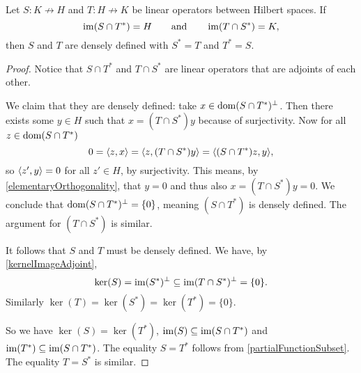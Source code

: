 \begin{proposition} \label{adjointRangeCriterion}
Let $S: K\not\to H$ and $T: H\not\to K$ be linear operators between Hilbert spaces. If
\[ \operatorname{im}(S\cap T^*) = H \qquad\text{and}\qquad \operatorname{im}(T\cap S^*) = K, \]
then $S$ and $T$ are densely defined with $S^* = T$ and $T^* = S$.
\end{proposition}
\begin{proof}
Notice that $S\cap T^*$ and $T\cap S^*$ are linear operators that are adjoints of each other.

We claim that they are densely defined: take $x\in \operatorname{dom}(S\cap T^*)^\perp$. Then there exists some $y\in H$ such that $x = (T\cap S^*)y$ because of surjectivity. Now for all $z\in \operatorname{dom}(S\cap T^*)$
\[ 0 = \inner{z,x} = \inner{z, (T\cap S^*)y} = \inner{(S\cap T^*)z, y}, \]
so $\inner{z',y} = 0$ for all $z'\in H$, by surjectivity. This means, by \ref{elementaryOrthogonality}, that $y=0$ and thus also $x = (T\cap S^*)y = 0$. We conclude that $\operatorname{dom}(S\cap T^*)^\perp = \{0\}$, meaning $(S\cap T^*)$ is densely defined. The argument for $(T\cap S^*)$ is similar.

It follows that $S$ and $T$ must be densely defined. We have, by \ref{kernelImageAdjoint},
\[ \ker(S) = \operatorname{im}(S^*)^\perp \subseteq \operatorname{im}(T\cap S^*)^\perp = \{0\}. \]
Similarly $\ker(T) = \ker(S^*) = \ker(T^*) = \{0\}$.

So we have $\ker(S) = \ker(T^*)$, $\operatorname{im}(S)\subseteq \operatorname{im}(S\cap T^*)$ and $\operatorname{im}(T^*)\subseteq \operatorname{im}(S\cap T^*)$. The equality $S = T^*$ follows from \ref{partialFunctionSubset}. The equality $T = S^*$ is similar.
\end{proof}


